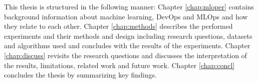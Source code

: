 This thesis is structured in the following manner: Chapter \ref{chap:mloper} contains background information about machine learning, DevOps and MLOps and how they relate to each other. Chapter \ref{chap:methods} describes the performed experiments and their methods and design including research questions, datasets and algorithms used and concludes with the results of the experiments. Chapter \ref{chap:discuss} revisits the research questions and discusses the interpretation of the results, limitations, related work and future work. Chapter \ref{chap:concl} concludes the thesis by summarizing key findings.